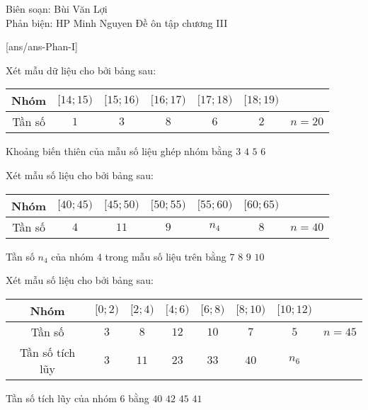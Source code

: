 ﻿\begin{name}
 {Biên soạn: Bùi Văn Lợi \\ Phản biện: HP Minh Nguyen}
 {Đề ôn tập chương III}
\end{name}

\caulc
{}[ans/ans\currfilebase-Phan-I]

\begin{ex}%
Xét mẫu dữ liệu cho bởi bảng sau:
\begin{center}
\begin{tabular}{|c|c|c|c|c|c|c|}
\hline 
Nhóm & $[14;15)$ & $[15;16)$ & $[16;17)$ & $[17;18)$ & $[18;19)$ & \\ 
\hline 
Tần số & $1$ & $3$ & $8$ & $6$ & $2$ & $n=20$ \\ 
\hline 
\end{tabular} 
\end{center}
Khoảng biến thiên của mẫu số liệu ghép nhóm bằng
\choice
{$3$}
{$4$}
{\True $5$}
{$6$}

\end{ex}

\begin{ex}%
Xét mẫu số liệu cho bởi bảng sau:
\begin{center}
\begin{tabular}{|c|c|c|c|c|c|c|}
\hline
Nhóm & $[40;45)$ & $[45;50)$ & $[50;55)$ & $[55;60)$ & $[60;65)$ & \\
\hline
Tần số & $4$ & $11$ & $9$ & $n_4$ & $8$ & $n=40$ \\
\hline
\end{tabular}
\end{center}
Tần số $n_4$ của nhóm $4$ trong mẫu số liệu trên bằng
\choice
{$7$}
{\True $8$}
{$9$}
{$10$}

\end{ex}

\begin{ex}%
Xét mẫu số liệu cho bởi bảng sau:
\begin{center}
\begin{tabular}{|c|c|c|c|c|c|c|c|}
\hline
Nhóm & $[0;2)$ & $[2;4)$ & $[4;6)$ & $[6;8)$ & $[8;10)$ & $[10;12)$ &\\
\hline
Tần số & $3$ & $8$ & $12$ & $10$ & $7$ & $5$ & $n=45$\\
\hline
Tần số tích lũy & $3$ & $11$ & $23$ & $33$ & $40$ & $n_6$ &\\
\hline
\end{tabular}
\end{center}
Tần số tích lũy của nhóm $6$ bằng
\choice
{$40$}
{$42$}
{\True $45$}
{$41$}

\end{ex}

